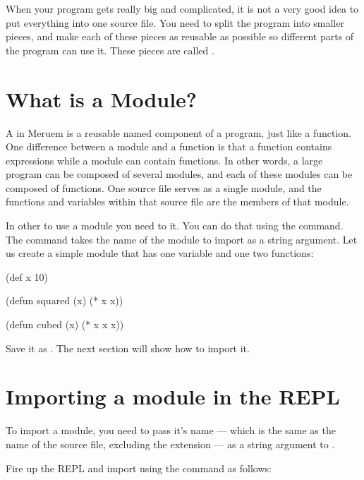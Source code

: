 When your program gets really big and complicated, it is not a very good idea to put everything into one source file. You need to split the program into smaller pieces, and make each of these pieces as reusable as possible so different parts of the program can use it. These pieces are called .

\section{What is a Module?}
A  in Meruem is a reusable named component of a program, just like a function. One difference between a module and a function is that a function contains expressions while a module can contain functions. In other words, a large program can be composed of several modules, and each of these modules can be composed of functions. One source file serves as a single module, and the functions and variables within that source file are the members of that module. 

In other to use a module you need to  it. You can do that using the  command. The  command takes the name of the module to import as a string argument. Let us create a simple module that has one variable and one two functions:

\begin{Meruem}
(def x 10)

(defun squared (x) (* x x))

(defun cubed (x) (* x x x))
\end{Meruem}

Save it as . The next section will show how to import it.

\section{Importing a module in the REPL}
To import a module, you need to pass it's name --- which is the same as the name of the source file, excluding the  extension --- as a string argument to . 

Fire up the REPL and import  using the  command as follows:

\begin{REPL}
meruem> (import "module_demo")
SomeModule(module_demo, MutableList(/home/melvic/meruem/lib/prelude), ArrayBuffer(cubed, module, x, squared)})
\end{REPL}


